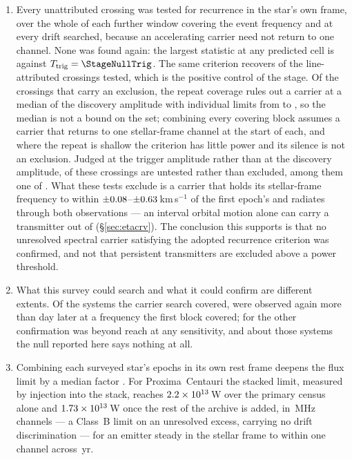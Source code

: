 \begin{enumerate}[leftmargin=1.6em,itemsep=4pt,topsep=4pt,parsep=0pt]
\item Every unattributed crossing was tested for recurrence in the star's
own frame, over the whole of each further window covering the event frequency
and at every drift searched, because an accelerating carrier need not return
to one channel. None was found again: the largest statistic at any predicted
cell is \RcTMax{} against $T_{\rm trig}=\StageNullTrig$. The same criterion
recovers \MkAttrRecur{} of the \MkAttrTested{} line-attributed crossings
tested, which is the positive control of the stage.
Of the \RcNExcl{} crossings
that carry an exclusion, the repeat coverage rules out a carrier at a median
\RcFracMed{} of the discovery amplitude with individual limits from
\RcFracMin{} to \RcFracMax, so the median is not a bound on the set;
combining every covering block assumes a carrier that returns to one
stellar-frame channel at the start of each, and where the repeat is shallow
the criterion has little power and its silence is not an exclusion. Judged at
the trigger amplitude rather than at the discovery amplitude,
\RcNPowerLoTrig{} of these crossings are untested rather than excluded, among
them one of \PrRankClause. What
these tests exclude is a carrier that holds its stellar-frame frequency to
within $\pm0.08$--$\pm0.63$\,km\,s$^{-1}$ of the first epoch's and
radiates through both observations --- an interval orbital motion alone can
carry a transmitter out of (\S\ref{sec:etacrv}). The conclusion
this supports is that no unresolved spectral carrier satisfying the adopted
recurrence criterion was confirmed, and not that persistent transmitters are
excluded above a power threshold.

\item What this survey could search and what it could confirm are different
extents. Of the \NSysClassA{} systems the carrier search covered,
\RcConfSysDay{} were observed again more than \EpSep{} day later at a
frequency the first block covered; for the other \RcNoRepSys{} confirmation
was beyond reach at any sensitivity, and about those systems the null
reported here says nothing at all.

\item Combining each surveyed star's epochs in its own rest frame deepens
the flux limit by a median factor \SyStkGainMed. For Proxima~Centauri the
stacked limit, measured by injection into the stack, reaches
$2.2\times10^{13}$\,W over the primary census alone and
$1.73\times10^{13}$\,W once the rest of the archive is added, in
\ChanBModeMHz\,MHz channels --- a Class~B limit on an unresolved excess,
carrying no drift discrimination --- for an emitter steady in the stellar
frame to within one channel across \StkProxSpanYr\,yr.


\end{enumerate}

